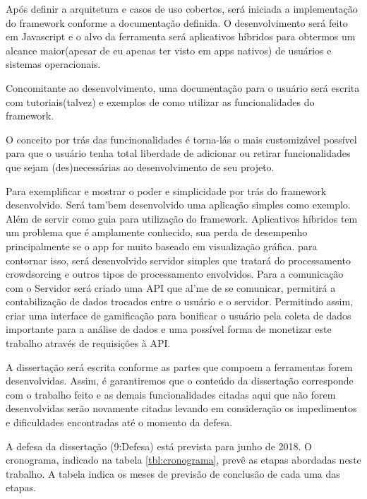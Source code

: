 \documentclass[12pt]{report} %
\begin{document}
Após definir a arquitetura e casos de uso cobertos, será iniciada a implementação do framework conforme a documentação definida. O desenvolvimento será feito em Javascript e o alvo da ferramenta será aplicativos híbridos para obtermos um alcance maior(apesar de eu apenas ter visto em apps nativos) de usuários e sistemas operacionais.  

Concomitante ao desenvolvimento, uma documentação para o usuário será escrita com tutoriais(talvez) e exemplos de como utilizar as funcionalidades do framework. 

O conceito por trás das funcinonalidades é torna-lás o mais customizável possível para que o usuário tenha total liberdade de adicionar ou retirar funcionalidades que sejam (des)necessárias ao desenvolvimento de seu projeto. 

Para exemplificar e mostrar o poder e simplicidade por trás do framework desenvolvido. Será tam'bem desenvolvido uma aplicação simples como exemplo. Além de servir como guia para utilização do framework. Aplicativos híbridos tem um problema que é amplamente conhecido, sua perda de desempenho principalmente se o app for muito baseado em visualização gráfica. para contornar isso, será desenvolvido servidor simples que tratará do processamento crowdsorcing e outros tipos de processamento envolvidos. Para a comunicação com o Servidor será criado uma API que al'me de se comunicar, permitirá a contabilização de dados trocados entre o usuário e o servidor. Permitindo assim, criar uma interface de gamificação para bonificar o usuário pela coleta de dados importante para a análise de dados e uma possível forma de monetizar este trabalho através de requisições à API.

A dissertação será escrita conforme as partes que compoem a ferramentas forem desenvolvidas. Assim, é garantiremos que o conteúdo da dissertação corresponde com o trabalho feito e as demais funcionalidades citadas aqui que não forem desenvolvidas serão novamente citadas levando em consideração os impedimentos e dificuldades encontradas até o momento da defesa.

A defesa da dissertação (9:Defesa) está prevista para junho de 2018. O cronograma, indicado na tabela \ref{tbl:cronograma}, prevê as etapas abordadas neste trabalho. A tabela indica os meses de previsão de conclusão de cada uma das etapas.
\end{document}
